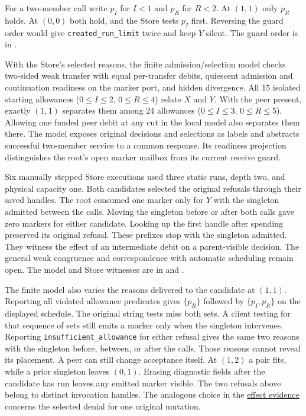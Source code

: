 \documentclass[11pt,a4paper]{article}
\theoremstyle{definition}
\theoremstyle{remark}
\begin{document}
For a two-member call write $p_I$ for $I<1$ and $p_R$ for $R<2$. At $(1,1)$ only $p_R$ holds. At $(0,0)$ both hold, and the Store tests $p_I$ first. Reversing the guard order would give \texttt{created\_run\_limit} twice and keep $Y$ silent. The guard order is in .

With the Store's selected reasons, the finite admission/selection model checks two-sided weak transfer with equal per-transfer debits, quiescent admission and continuation readiness on the marker port, and hidden divergence. All 15 isolated starting allowances ($0\le I\le2$, $0\le R\le4$) relate $X$ and $Y$. With the peer present, exactly $(1,1)$ separates them among 24 allowances ($0\le I\le3$, $0\le R\le5$). Allowing one funded peer debit at any cut in the local model also separates them there. The model exposes original decisions and selections as labels and abstracts successful two-member service to a common response. Its readiness projection distinguishes the root's open marker mailbox from its current receive guard.

Six manually stepped Store executions used three static runs, depth two, and physical capacity one. Both candidates selected the original refusals through their saved handles. The root consumed one marker only for $Y$ with the singleton admitted between the calls. Moving the singleton before or after both calls gave zero markers for either candidate. Looking up the first handle after spending preserved its original refusal. These prefixes stop with the singleton admitted. They witness the effect of an intermediate debit on a parent-visible decision. The general weak congruence and correspondence with automatic scheduling remain open. The model and Store witnesses are in  and .

The finite model also varies the reasons delivered to the candidate at $(1,1)$. Reporting all violated allowance predicates gives $\{p_R\}$ followed by $\{p_I,p_R\}$ on the displayed schedule. The original string tests miss both sets. A client testing for that sequence of sets still emits a marker only when the singleton intervenes. Reporting \texttt{insufficient\_allowance} for either refusal gives the same two reasons with the singleton before, between, or after the calls. Those reasons cannot reveal its placement. A peer can still change acceptance itself. At $(1,2)$ a pair fits, while a prior singleton leaves $(0,1)$. Erasing diagnostic fields after the candidate has run leaves any emitted marker visible. The two refusals above belong to distinct invocation handles. The analogous choice in the \hyperref[par:effect-evidence]{effect evidence} concerns the selected denial for one original mutation.
\end{document}

